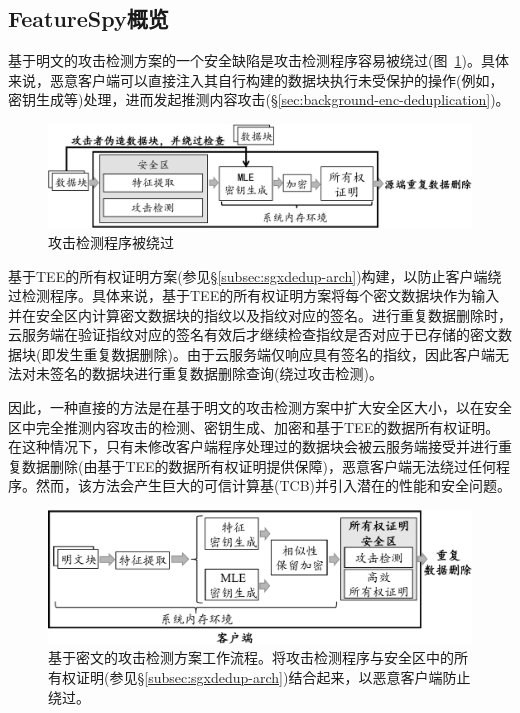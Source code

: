 \subsection{FeatureSpy概览}
\label{subsec:featurespy-secure_design}

基于明文的攻击检测方案的一个安全缺陷是攻击检测程序容易被绕过(图~\ref{fig:featurespy-architecture-strawman-bypass})。具体来说，恶意客户端可以直接注入其自行构建的数据块执行未受保护的操作(例如，密钥生成等)处理，进而发起推测内容攻击(\S\ref{sec:background-enc-deduplication})。

\begin{figure}[!htb]
  \centering
  \includegraphics[width=\textwidth]{pic/featurespy/naive-problem.pdf}
  \caption{攻击检测程序被绕过}
  \label{fig:featurespy-architecture-strawman-bypass}
\end{figure}


\sysnameF 基于TEE的所有权证明方案(参见\S\ref{subsec:sgxdedup-arch})构建，以防止客户端绕过检测程序。具体来说，基于TEE的所有权证明方案将每个密文数据块作为输入并在安全区内计算密文数据块的指纹以及指纹对应的签名。进行重复数据删除时，云服务端在验证指纹对应的签名有效后才继续检查指纹是否对应于已存储的密文数据块(即发生重复数据删除)。由于云服务端仅响应具有签名的指纹，因此客户端无法对未签名的数据块进行重复数据删除查询(绕过攻击检测)。

因此，一种直接的方法是在基于明文的攻击检测方案中扩大安全区大小，以在安全区中完全推测内容攻击的检测、密钥生成、加密和基于TEE的数据所有权证明。在这种情况下，只有未修改客户端程序处理过的数据块会被云服务端接受并进行重复数据删除(由基于TEE的数据所有权证明提供保障)，恶意客户端无法绕过任何程序。然而，该方法会产生巨大的可信计算基(TCB)并引入潜在的性能\cite{arnautov2016SCONE, harnik2018SGX, dinhngoc2019Everything}和安全\cite{lie2005TCB}问题。

\begin{figure}[!htb]
  \centering
  \includegraphics[width=\textwidth]{pic/featurespy/architecture.pdf}
  \caption{基于密文的攻击检测方案工作流程。\sysnameF 将攻击检测程序与安全区中的所有权证明(参见\S\ref{subsec:sgxdedup-arch})结合起来，以恶意客户端防止绕过。}
  \label{fig:featurespy-architecture-secure}
\end{figure}

